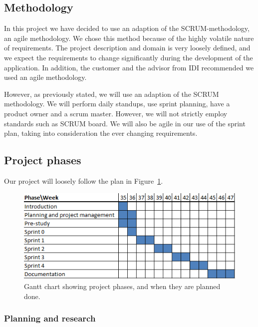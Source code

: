 \subsection{Methodology}

In this project we have decided to use an adaption of the SCRUM-methodology, an
agile methodology. We chose this method because of the highly volatile nature
of requirements. The project description and domain is very loosely defined,
and we expect the requirements to change significantly during the development
of the application. In addition, the customer and the advisor from IDI
recommended we used an agile methodology.

However, as previously stated, we will use an adaption of the SCRUM
methodology. We will perform daily standups, use sprint planning, have a
product owner and a scrum master. However, we will not strictly employ
standards such as SCRUM board. We will also be agile in our use of the sprint
plan, taking into consideration the ever changing requirements.


\subsection{Project phases}

Our project will loosely follow the plan in Figure~\ref{gantt:project}.

\begin{figure}[h]
\centering
  \includegraphics[width=1.0\textwidth]{project_management/project_effort_estimation}
  \caption[Gantt chart of project phases]{Gantt chart showing project phases, and when they are planned done.}
  \label{gantt:project}
\end{figure}

\subsubsection{Planning and research}

